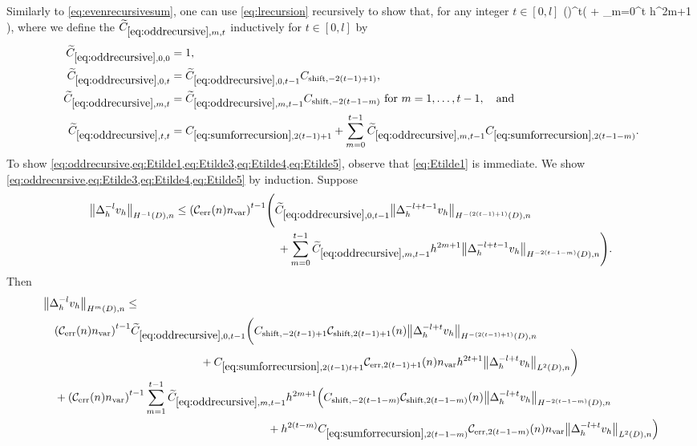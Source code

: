 Similarly to \cref{eq:evenrecursivesum}, one can use \cref{eq:lrecursion} recursively to show that, for any integer $t \in [0,l]$
\beq\label{eq:oddrecursive}
 \leq \mleft(\En \nvar\mright)^t\mleft(  + \sum_{m=0}^t  h^{2m+1}  \mright),
\eeq
where  we define the $\Etildefn{m,t}$ inductively for $t \in [0,l]$ by
\begin{align}
\label{eq:Etilde1}\Etildefn{0,0} &= 1,\\
\label{eq:Etilde3}\Etildefn{0,t} &= \Etildefn{0,t-1}\Cshiftfn{2(t-1)+1)},\\
\label{eq:Etilde4}\Etildefn{m,t} &= \Etildefn{m,t-1}\Cshiftfn{2(t-1-m)}\tfor m = 1,\ldots,t-1,\quad\text{and}\\
\label{eq:Etilde5}\Etildefn{t,t} &= \Csumrecfn{2(t-1)+1} + \sum_{m=0}^{t-1}\Etildefn{m,t-1}\Csumrecfn{2(t-1-m)}.
\end{align}
To show \cref{eq:oddrecursive,eq:Etilde1,eq:Etilde3,eq:Etilde4,eq:Etilde5}, observe that \cref{eq:Etilde1} is immediate. We show \cref{eq:oddrecursive,eq:Etilde3,eq:Etilde4,eq:Etilde5} by induction. Suppose %
\begin{align*}
  \NHnfn{-1}{D}{\Deltah^{-l}\vh} \leq \mleft(\En \nvar\mright)^{t-1}&\Bigg(\Etildefn{0,t-1} \NHnfn{-(2(t-1)+1)}{D}{\Deltah^{-l+t-1}\vh}\\
& \quad + \sum_{m=0}^{t-1} \Etildefn{m,t-1} h^{2m+1}  \NHnfn{-2(t-1-m)}{D}{\Deltah^{-l+t-1}\vh}\Bigg).
\end{align*}
Then
\begin{align}
  &\NHnfn{m}{D}{\Deltah^{-l}\vh} \leq\nonumber\\
  &\quad\mleft(\En \nvar\mright)^{t-1} \Etildefn{0,t-1}\bigg(\Cshiftfn{2(t-1)+1} \shiftn{2(t-1)+1}\NHnfn{-(2(t-1)+1)}{D}{\Deltah^{-l + t}\vh}\nonumber\\
    &\quad\quad\quad\quad\quad\quad\quad\quad\quad\quad\quad\quad\quad\quad+\Csumrecfn{2(t-1)t+1} \errn{2(t-1)+1}\nvar h^{2t+1} \NLtDn{\Deltah^{-l + t}\vh}\bigg)\nonumber\\
  &\quad+ \mleft(\En \nvar\mright)^{t-1}\sum_{m=1}^{t-1} \Etildefn{m,t-1} h^{2m+1}\Big(\Cshiftfn{2(t-1-m)} \shiftn{2(t-1-m)}\NHnfn{-2(t-1-m)}{D}{\Deltah^{-l + t}\vh}\nonumber\\
  &\quad\quad\quad\quad\quad\quad\quad\quad\quad\quad\quad\quad\quad\quad\quad\quad\quad\quad\quad\quad+ h^{2(t-m)} \Csumrecfn{2(t-1-m)}\errn{2(t-1-m)}\nvar \NLtDn{\Deltah^{-l + t}\vh}\Big)\label{eq:verylongeq}
\end{align}
